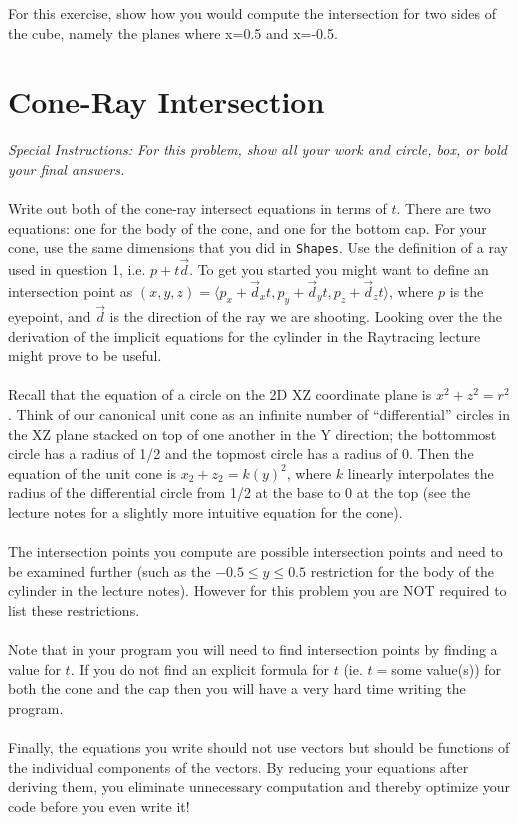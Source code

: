 \documentclass[10pt,twocolumn]{article}
\begin{document}
For this exercise, show how you would compute the intersection for two sides of the cube, namely the planes where x=0.5 and x=-0.5.



\section{Cone-Ray Intersection}
{\it Special Instructions: For this problem, show all your work and circle, box, or bold your final answers.}\\\\
Write out both of the cone-ray intersect equations in terms of $t$. There are two equations: one for the body of the cone, and one for the bottom cap. For your cone, use the same dimensions that you did in {\tt Shapes}. Use the definition of a ray used in question 1, i.e. $p + t\vec{d}$. To get you started you might want to define
an intersection point as $(x, y, z) = \langle p_x + \vec{d}_xt, p_y + \vec{d}_yt, p_z + \vec{d}_zt\rangle$, where $p$ is the eyepoint, and $\vec{d}$ is the direction of the ray we are shooting. Looking over the the derivation of the implicit equations for the cylinder in the Raytracing lecture might prove to be useful.\\\\
Recall that the equation of a circle on the 2D XZ coordinate plane is $x^2 + z^2 = r^2$. Think of our canonical unit cone as an infinite number of ``differential'' circles in the XZ plane stacked on top of one another in the Y direction; the bottommost circle has a radius of 1/2 and the topmost circle has a radius of 0. Then the equation of the unit cone is $x_2 + z_2 = k(y)^2$, where $k$ linearly interpolates the radius of the differential circle from 1/2 at the base to 0 at the top (see the lecture notes for a slightly more intuitive equation for the cone).\\\\
The intersection points you compute are possible intersection points and need to be
examined further (such as the $-0.5\le y\le 0.5$ restriction for the body of the cylinder
in the lecture notes). However for this problem you are NOT required to list these
restrictions.\\\\
Note that in your program you will need to find intersection points by finding a value for $t$. If you do not find an explicit formula for $t$ (ie. $t = $some value(s)) for both the cone and the cap then you will have a very hard time writing the program.\\\\
Finally, the equations you write should not use vectors but should be functions of the individual components of the vectors. By reducing your equations after deriving them, you eliminate unnecessary computation and thereby optimize your code before you even write it!
\end{document}
